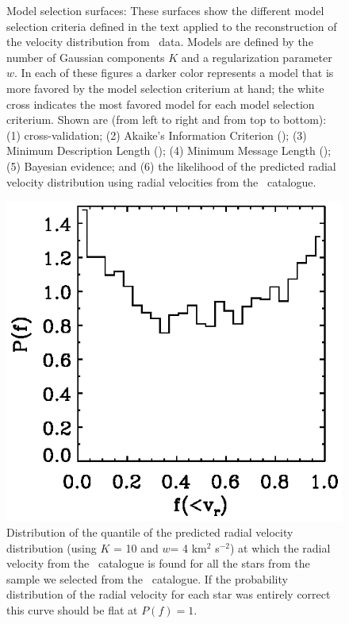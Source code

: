 \begin{figure}
\caption[Model selection surfaces that show the different model selection criteria defined in the text applied to the reconstruction of the velocity distribution from \Hipparcos\ data]{Model selection surfaces: These surfaces show the different model selection criteria defined in the text applied to the reconstruction of the velocity distribution from \Hipparcos\ data. Models are defined by the number of Gaussian components $K$ and a regularization parameter $w$. In each of these figures a darker color represents a model that is more favored by the model selection criterium at hand; the white cross indicates the most favored model for each model selection criterium. Shown are (from left to right and from top to bottom): (1) cross-validation; (2) Akaike's Information Criterion (\AIC); (3) Minimum Description Length (\MDL); (4) Minimum Message Length (\MML); (5) Bayesian evidence; and (6) the likelihood of the predicted radial velocity distribution using radial velocities from the \gcsabb\ catalogue.}%
\label{fig:modelselection}
\end{figure}


\clearpage
\begin{figure}
\includegraphics{figs_veldist/checkquants.ps}
\caption[Distribution of the quantile of the predicted radial velocity distribution (using $K$ = 10 and $w$= 4 km$^2$ s$^{-2}$) at which the radial velocity from the \gcsabb\ catalogue is found for all the stars from the sample we selected from the \gcsabb\ catalogue]{Distribution of the quantile of the predicted radial velocity distribution (using $K$ = 10 and $w$= 4 km$^2$ s$^{-2}$) at which the radial velocity from the \gcsabb\ catalogue is found for all the stars from the sample we selected from the \gcsabb\ catalogue. If the probability distribution of the radial velocity for each star was entirely correct this curve should be flat at $P(f) = 1$.}%
\label{fig:checkquants}
\end{figure}

